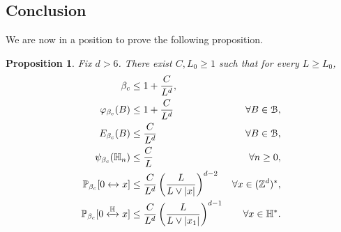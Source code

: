 \documentclass[11pt,a4paper]{article}
\numberwithin{equation}{section}
\theoremstyle{plain}
\newtheorem{Prop}[Thm]{Proposition}
\theoremstyle{definition}
\newcommand{\connect}{\xleftrightarrow}
\begin{document}
\subsection{Conclusion}\label{sec:2.3}

We are now in a position to prove the following proposition.

\begin{Prop}\label{prop: final prop proof mainperco thm}
Fix $d>6$. There exist $C,L_0\geq 1$ such that for every $L\geq L_0$,
\begin{align}
\beta_c&\leq 1+\frac{C}{L^d}, \label{eq:bound final beta_c}
\\
\varphi_{\beta_c}(B)&\le 1+\frac{C}{L^d} &\forall B\in\mathcal B,\label{eq:bound final phi block}
\\
E_{\beta_c}(B)&\leq \frac{C}{L^d} &\forall B\in \mathcal B,\label{eq:error amplitude general blocks}
\\
\psi_{\beta_c}(\mathbb H_n)&\le \frac{C}{L} &\forall n\ge 0, \label{eq:bound final psi}
\\
\mathbb P_{\beta_c}[0\connect{}x] &\le \frac{C}{L^d}\left(\frac{L}{L\vee |x|}\right)^{d-2}&\forall x\in (\mathbb Z^d)^*,\label{eq:upper bound below L perco}
\\
\mathbb P_{\beta_c}[0\connect{\mathbb H\:}x]&\le\frac{C}{L^d}\left(\frac{L}{L\vee |x_1|}\right)^{d-1}&\forall x\in \mathbb H^*\label{eq:upper half-spacebound below L perco}.
\end{align} 
\end{Prop}
\end{document}
